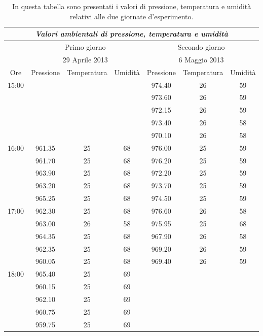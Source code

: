 \documentclass[11pt, twoside, a4paper]{article}
\begin{document}
\begin{table}

\begin{center}
\begin{tabular}{c|c c c|c c c}
\hline
	\multicolumn{7}{c}{\emph{Valori ambientali di pressione, temperatura e umidità}} \\
\hline
\multirow{2}{*}{$\,$} & \multicolumn{3}{c|}{Primo giorno} & \multicolumn{3}{c}{Secondo giorno} \\
 & \multicolumn{3}{c|}{29 Aprile 2013} & \multicolumn{3}{c}{6 Maggio 2013} \\
\hline
Ore & Pressione & Temperatura & Umidità & Pressione & Temperatura & Umidità \\
\hline
\multirow{5}{*}{15:00} & $\,$ & $\,$ & $\,$ & 974.40 & 26 & 59 \\
 & $\,$ & $\,$ & $\,$ & 973.60 & 26 & 59 \\
 & $\,$ & $\,$ & $\,$ & 972.15 & 26 & 59 \\
 & $\,$ & $\,$ & $\,$ & 973.40 & 26 & 58 \\
 & $\,$ & $\,$ & $\,$ & 970.10 & 26 & 58 \\
\hline
\multirow{5}{*}{16:00} & 961.35 & 25 & 68 & 976.00 & 25 & 59 \\
 & 961.70 & 25 & 68 & 976.20 & 25 & 59 \\
 & 963.90 & 25 & 68 & 972.20 & 25 & 59 \\
 & 963.20 & 25 & 68 & 973.70 & 25 & 59 \\
 & 965.25 & 25 & 68 & 974.50 & 25 & 59 \\
\hline
\multirow{5}{*}{17:00} & 962.30 & 25 & 68 & 976.60 & 26 & 58 \\
 & 963.00 & 26 & 58 & 975.95 & 25 & 68 \\
 & 964.35 & 25 & 68 & 967.90 & 26 & 58\\
 & 962.35 & 25 & 68 & 969.20 & 26 & 59\\
 & 960.05 & 25 & 68 & 969.40 & 26 & 59 \\
\hline
\multirow{5}{*}{18:00} & 965.40 & 25 & 69 & $\,$ & $\,$ & $\,$ \\
 & 960.15 & 25 & 69 & $\,$ & $\,$ & $\,$ \\
 & 962.10 & 25 & 69 & $\,$ & $\,$ & $\,$ \\
 & 960.75 & 25 & 69 & $\,$ & $\,$ & $\,$ \\
 & 959.75 & 25 & 69 & $\,$ & $\,$ & $\,$ \\
\end{tabular}
\end{center}

\label{tab:ptu}
\caption{In questa tabella sono presentati i valori di pressione, temperatura e umidità relativi alle due giornate d'esperimento.}

\end{table}
\end{document}
